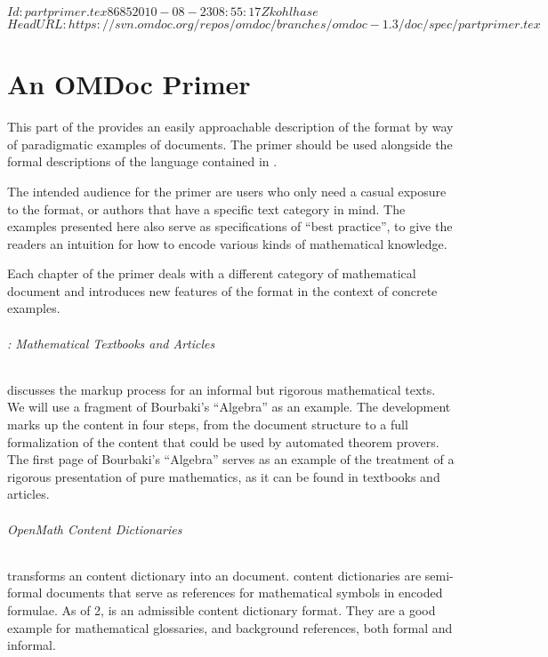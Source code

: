 \svnInfo $Id: partprimer.tex 8685 2010-08-23 08:55:17Z kohlhase $
\svnKeyword $HeadURL: https://svn.omdoc.org/repos/omdoc/branches/omdoc-1.3/doc/spec/partprimer.tex $

\part{An OMDoc Primer}\label{part:primer}
This part of the {\report} provides an easily approachable description of the {\omdoc}
format by way of paradigmatic examples of {\omdoc} documents.  The primer should be used
alongside the formal descriptions of the language contained in
{}.

The intended audience for the primer are users who only need a casual exposure to the
format, or authors that have a specific text category in mind.  The examples presented
here also serve as specifications of ``best practice'', to give the readers an intuition
for how to encode various kinds of mathematical knowledge.

Each chapter of the {\omdoc} primer deals with a different category of mathematical
document and introduces new features of the {\omdoc} format in the context of concrete
examples.

\paragraph{: Mathematical Textbooks and Articles} discusses the markup
process for an informal but rigorous mathematical texts.  We will use a fragment of
Bourbaki's ``Algebra'' as an example.  The development marks up the content in four steps,
from the document structure to a full formalization of the content that could be used by
automated theorem provers.  The first page of Bourbaki's ``Algebra'' serves as an example
of the treatment of a rigorous presentation of pure mathematics, as it can be found in
textbooks and articles.

\paragraph{ OpenMath Content Dictionaries} transforms an {\openmath}
content dictionary into an {\omdoc} document. {\openmath} content dictionaries are
semi-formal documents that serve as references for mathematical symbols in {\openmath}
encoded formulae.  As of {\openmath}2, {\omdoc} is an admissible {\openmath} content
dictionary format. They are a good example for mathematical glossaries, and background
references, both formal and informal.

